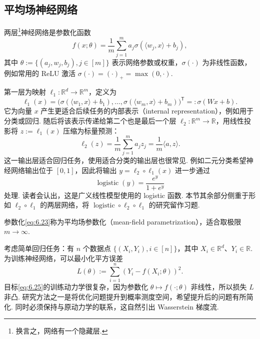 \subsection{平均场神经网络}\label{sec:6.5}

两层\footnote{换言之，网络有一个隐藏层.}神经网络是参数化函数
\begin{equation}\label{eq:6.23}
f(x;\theta)=\frac1m\sum_{j=1}^ma_j\sigma(\langle w_j,x\rangle+b_j),
\end{equation}
其中 $\theta:=\{(a_j,w_j,b_j),j\in[m]\}$ 表示网络参数或权重，$\sigma(\cdot)$ 为非线性函数，例如常用的 ReLU 激活 $\sigma(\cdot)=(\cdot)_+=\max(0,\cdot)$.

第一层为映射 $\ell_1:\mathbb R^d\to\mathbb R^m$，定义为
\begin{equation}\label{eq:6.24}
\ell_1(x)=\bigl(\sigma(\langle w_1,x\rangle+b_1),\ldots,
\sigma(\langle w_m,x\rangle+b_m)\bigr)^{\mathsf T}
=:\sigma(Wx+b).
\end{equation}
它为向量 $x$ 产生更适合后续任务的内部表示（internal representation），例如用于分类或回归. 随后将该表示传递给第二个也是最后一个层 $\ell_2:\mathbb R^m\to\mathbb R$，用线性投影将 $z:=\ell_1(x)$ 压缩为标量预测：
$$
\ell_2(z)=\frac1m\sum_{j=1}^ma_jz_j=\frac1m\langle a,z\rangle.
$$
这一输出层适合回归任务，使用适合分类的输出层也很常见. 例如二元分类希望神经网络输出位于 $[0,1]$，因此将输出 $y=\ell_2\circ\ell_1(x)$ 进一步通过
$$
\operatorname{logistic}(y)=\frac{e^y}{1+e^y}
$$
处理. 读者会认出，这是广义线性模型使用的 logistic 函数. 本节其余部分侧重于形如 $\ell_2\circ\ell_1$ 的两层网络，将 $\operatorname{logistic}\circ\ell_2\circ\ell_1$ 的研究留作习题.

参数化\eqref{eq:6.23}称为平均场参数化（mean-field parametrization），适合取极限 $m\to\infty$.

考虑简单回归任务：有 $n$ 个数据点 $\{(X_i,Y_i),i\in[n]\}$，其中 $X_i\in\mathbb R^d$、$Y_i\in\mathbb R$. 为训练神经网络，可以最小化平方误差
\begin{equation}\label{eq:6.25}
L(\theta):=\sum_{i=1}^n(Y_i-f(X_i;\theta))^2.
\end{equation}
目标\eqref{eq:6.25}的训练动力学很复杂，因为参数化 $\theta\mapsto f(\cdot;\theta)$ 非线性，所以损失 $L$ 非凸. 研究方法之一是将优化问题提升到概率测度空间，希望提升后的问题有所简化. 同时必须保持与原动力学的联系，这自然引出 Wasserstein 梯度流.


